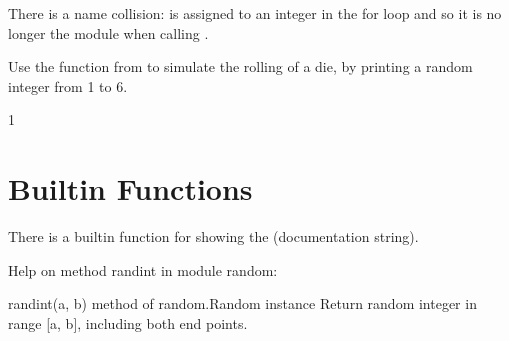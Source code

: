 \documentclass[letterpaper,10pt,english]{sphinxmanual}
\begin{document}
There is a name collision:  is assigned to an integer in the for loop and so it is no longer the module  when calling .

 Use the  function from  to simulate the rolling of a die, by printing a random integer from 1 to 6.

\begin{sphinxVerbatim}[commandchars=\\\{\}]
 
 
\end{sphinxVerbatim}

\begin{sphinxVerbatim}[commandchars=\\\{\}]
1
\end{sphinxVerbatim}


\section{Built\sphinxhyphen{}in Functions}
\label{\detokenize{Lecture4/Using Functions:built-in-functions}}

There is a built\sphinxhyphen{}in function  for showing the  (documentation string).

\begin{sphinxVerbatim}[commandchars=\\\{\}]
 
  
\end{sphinxVerbatim}

\begin{sphinxVerbatim}[commandchars=\\\{\}]
Help on method randint in module random:

randint(a, b) method of random.Random instance
    Return random integer in range [a, b], including both end points.
\end{sphinxVerbatim}

\begin{sphinxVerbatim}[commandchars=\\\{\}]
  
\end{sphinxVerbatim}
\end{document}

